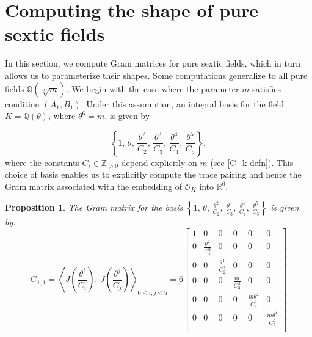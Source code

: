 \documentclass[table]{amsart}
\newtheorem{proposition}[theorem]{Proposition}
\newcommand{\Q}{\mathbb{Q}}
\numberwithin{equation}{section}
\begin{document}
   

    
\section{Computing the shape of pure sextic fields}\label{s 3}

\par In this section, we compute Gram matrices for pure sextic fields, which in turn allows us to parameterize their shapes. Some computations generalize to all pure fields $\Q(\sqrt[n]{m})$. We begin with the case where the parameter $m$ satisfies condition $(A_1, B_1)$. Under this assumption, an integral basis for the field $K = \mathbb{Q}(\theta)$, where $\theta^6 = m$, is given by

$$
\left\{1,\, \theta,\, \frac{\theta^2}{C_2},\, \frac{\theta^3}{C_3},\, \frac{\theta^4}{C_4},\, \frac{\theta^5}{C_5} \right\},
$$
\noindent where the constants $C_i \in \mathbb{Z}_{>0}$ depend explicitly on $m$ (see \eqref{C_k defn}). This choice of basis enables us to explicitly compute the trace pairing and hence the Gram matrix associated with the embedding of $\mathcal{O}_K$ into $\mathbb{R}^6$.


\begin{proposition}\label{gram11}
The Gram matrix for the basis $\left\{ 1,\, \theta,\, \frac{\theta^2}{C_2},\, \frac{\theta^3}{C_3},\, \frac{\theta^4}{C_4},\, \frac{\theta^5}{C_5} \right\}$ is given by:
\[
G_{1,1} = \left\langle J\left(\frac{\theta^{i}}{C_i}\right),\, J\left(\frac{\theta^{j}}{C_j}\right) \right\rangle_{0 \leq i,j \leq 5}
= 6 
\begin{bmatrix}
1&0& 0 & 0 & 0 & 0 \\[8pt]
 0&\frac{\theta^2}{C_1^2}  & 0 & 0 & 0 & 0 \\[8pt]
 0& 0 & \frac{\theta^4}{C_2^2} & 0 & 0 & 0 \\[8pt]
 0&0 & 0 & \frac{m}{C_3^2} & 0 & 0 \\[8pt]
 0&0 & 0 & 0 & \frac{m\theta^2}{C_4^2} & 0 \\[8pt]
 0&0 & 0 & 0 & 0 & \frac{m\theta^{4}}{C_5^2} \\[8pt]
\end{bmatrix}
\]
\end{proposition}
\end{document}
